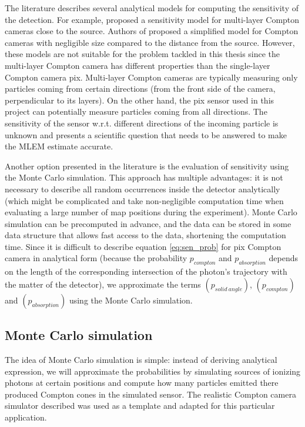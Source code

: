 The literature describes several analytical models for computing the sensitivity of the detection. 
For example, \cite{wilderman2001} proposed a sensitivity model for multi-layer Compton cameras close to the source.
Authors of \cite{maxim2016} proposed a simplified model for Compton cameras with negligible size compared to the distance from the source.
However, these models are not suitable for the problem tackled in this thesis since the multi-layer Compton camera has different properties than the single-layer Compton camera \ac{pix}.
Multi-layer Compton cameras are typically measuring only particles coming from certain directions (from the front side of the camera, perpendicular to its layers).
On the other hand, the \ac{pix} sensor used in this project can potentially measure particles coming from all directions.
The sensitivity of the sensor w.r.t. different directions of the incoming particle is unknown and presents a scientific question that needs to be answered to make the \ac{MLEM} estimate accurate. 

Another option presented in the literature is the evaluation of sensitivity using the Monte Carlo simulation.
This approach has multiple advantages: it is not necessary to describe all random occurrences inside the detector analytically (which might be complicated and take non-negligible computation time when evaluating a large number of map positions during the experiment).
Monte Carlo simulation can be precomputed in advance, and the data can be stored in some data structure that allows fast access to the data, shortening the computation time.
Since it is difficult to describe  equation \ref{eq:sen_prob} for \ac{pix} Compton camera in analytical form 
(because the probability $p_{compton}$ and $p_{absorption}$ depends on the length of the corresponding intersection of the photon's trajectory with the matter of the detector),
we approximate the terms $(p_{solid\ angle})$, $(p_{compton})$ and $(p_{absorption})$ using the Monte Carlo simulation.%



\subsection{Monte Carlo simulation}%
The idea of Monte Carlo simulation is simple:
instead of deriving analytical expression,
we will approximate the probabilities by simulating sources of ionizing photons at certain positions and compute how many particles emitted there produced Compton cones in the simulated sensor.
The realistic Compton camera simulator described \cite{baca2019timepix} was used as a template and adapted for this particular application.

